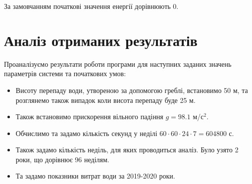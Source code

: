 \documentclass[12pt]{article}
\numberwithin{equation}{section}
\numberwithin{figure}{section}
\begin{document}
За замовчанням початкові значення енергії дорівнюють 0.

\newpage

\section{Аналіз отриманих результатів}

Проаналізуємо результати роботи програми для наступних заданих значень параметрів системи та початкових умов:
\begin{itemize}
\item Висоту перепаду води, утвореною за допомогою греблі, встановимо 50 м, та розглянемо також випадок коли висота перепаду буде 25 м.
\item Також встановимо прискорення вільного падіння $g=98.1$ м/с$^2$.
\item Обчислимо та задамо кількість секунд у неділі $60\cdot60\cdot24\cdot7=604800$ с.
\item Також задамо кількість неділь, для яких проводиться аналіз. Було узято 2 роки, що дорівнює 96 неділям.
\item Та задамо показники витрат води за 2019-2020 роки.
\end{itemize}
\end{document}
